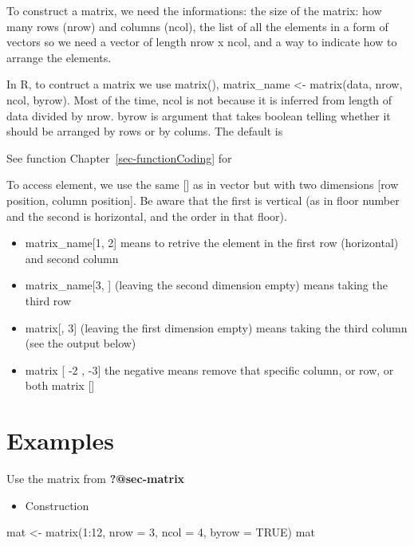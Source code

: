 \documentclass[
  letterpaper,
  DIV=11,
  numbers=noendperiod]{scrreprt}
\newenvironment{Shaded}{\begin{snugshade}}{\end{snugshade}}
\newcommand{\AttributeTok}[1]{\textcolor[rgb]{0.40,0.45,0.13}{#1}}
\newcommand{\ConstantTok}[1]{\textcolor[rgb]{0.56,0.35,0.01}{#1}}
\newcommand{\DecValTok}[1]{\textcolor[rgb]{0.68,0.00,0.00}{#1}}
\newcommand{\FunctionTok}[1]{\textcolor[rgb]{0.28,0.35,0.67}{#1}}
\newcommand{\NormalTok}[1]{\textcolor[rgb]{0.00,0.23,0.31}{#1}}
\newcommand{\OtherTok}[1]{\textcolor[rgb]{0.00,0.23,0.31}{#1}}
\newcommand{\SpecialCharTok}[1]{\textcolor[rgb]{0.37,0.37,0.37}{#1}}
\providecommand{\tightlist}{%
  \setlength{\itemsep}{0pt}\setlength{\parskip}{0pt}}
\begin{document}
To construct a matrix, we need the informations: the size of the matrix:
how many rows (nrow) and columns (ncol), the list of all the elements in
a form of vectors so we need a vector of length nrow x ncol, and a way
to indicate how to arrange the elements.

In R, to contruct a matrix we use matrix(), matrix\_name \textless-
matrix(data, nrow, ncol, byrow). Most of the time, ncol is not because
it is inferred from length of data divided by nrow. byrow is argument
that takes boolean telling whether it should be arranged by rows or by
colums. The default is

See function Chapter~\ref{sec-functionCoding} for

To access element, we use the same {[}{]} as in vector but with two
dimensions {[}row position, column position{]}. Be aware that the first
is vertical (as in floor number and the second is horizontal, and the
order in that floor).

\begin{itemize}
\tightlist
\item
  matrix\_name{[}1, 2{]} means to retrive the element in the first row
  (horizontal) and second column
\item
  matrix\_name{[}3, {]} (leaving the second dimension empty) means
  taking the third row
\item
  matrix{[}, 3{]} (leaving the first dimension empty) means taking the
  third column (see the output below)
\item
  matrix {[} -2 , -3{]} the negative means remove that specific column,
  or row, or both matrix {[}{]}
\end{itemize}

\section*{Examples}\label{examples-34}


Use the matrix from \textbf{?@sec-matrix}

\begin{itemize}
\tightlist
\item
  Construction
\end{itemize}

\begin{Shaded}
\begin{Highlighting}[]
\NormalTok{mat }\OtherTok{\textless{}{-}} \FunctionTok{matrix}\NormalTok{(}\DecValTok{1}\SpecialCharTok{:}\DecValTok{12}\NormalTok{, }\AttributeTok{nrow =} \DecValTok{3}\NormalTok{, }\AttributeTok{ncol =} \DecValTok{4}\NormalTok{, }\AttributeTok{byrow =} \ConstantTok{TRUE}\NormalTok{)}
\NormalTok{mat}
\end{Highlighting}
\end{Shaded}
\end{document}
